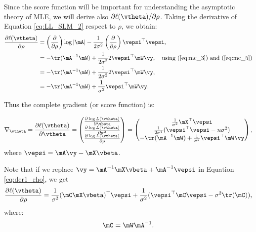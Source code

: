 \documentclass[english,12pt]{book}\usepackage[]{graphicx}\usepackage[]{xcolor}
\begin{document}
Since the score function will be important for understanding the asymptotic theory of MLE, we will derive also $\partial \ell(\vtheta) / \partial \rho$. Taking the derivative of Equation \eqref{eq:LL_SLM_2} respect to $\rho$, we obtain:
\begin{equation}\label{eq:der1_rho}
  \begin{aligned}
      \frac{\partial \ell(\vtheta)}{\partial \rho} & =  \left(\frac{\partial}{\partial \rho}\right)\log \left| \mA\right| -  \frac{1}{2\sigma^2}\left(\frac{\partial}{\partial \rho}\right)\vepsi^\top \vepsi, \\
      & = - \tr(\mA^{-1}\mW) +\frac{1}{2\sigma^2}2\vepsi^\top\mW\vy,\quad\mbox{using (\ref{eq:mc_3}) and (\ref{eq:mc_5})} \\
      & = - \tr(\mA^{-1}\mW) +\frac{1}{2\sigma^2}2\vepsi^\top\mW\vy, \\
      & = - \tr(\mA^{-1}\mW) +\frac{1}{\sigma^2}\vepsi^\top\mW\vy. 
  \end{aligned}
\end{equation}

Thus the complete gradient (or score function) is:

\begin{equation}\label{eq:full_agradient}
  \nabla_{\vtheta} = \frac{\partial \ell(\vtheta)}{\partial \vtheta} = 
    \begin{pmatrix}
    \frac{\partial \log L(\vtheta)}{\partial \vbeta} \\
    \frac{\partial \log L(\vtheta)}{\partial \sigma^2} \\
    \frac{\partial \log L(\vtheta)}{\partial \rho}
    \end{pmatrix}
    =
    \begin{pmatrix}
    \frac{1}{\sigma^2}\mX^\top\vepsi \\
    \frac{1}{2\sigma^4}(\vepsi^\top\vepsi-n\sigma^2) \\
    - \tr(\mA^{-1}\mW) +\frac{1}{\sigma^2}\vepsi^\top\mW\vy
    \end{pmatrix},
\end{equation}
%
where $\vepsi = \mA\vy - \mX\vbeta$.

Note that if we replace $\vy = \mA^{-1}\mX\vbeta + \mA^{-1}\vepsi$ in Equation \eqref{eq:der1_rho}, we get
\begin{equation*}
 \frac{\partial \ell(\vtheta)}{\partial \rho} = \frac{1}{\sigma^2}(\mC\mX\vbeta)^\top \vepsi + \frac{1}{\sigma^2}(\vepsi^\top\mC\vepsi - \sigma^2 \tr(\mC)),
\end{equation*}
%
where:
\begin{equation}\label{eq:Cmatrix}
  \mC = \mW\mA^{-1}.
\end{equation}
\end{document}
